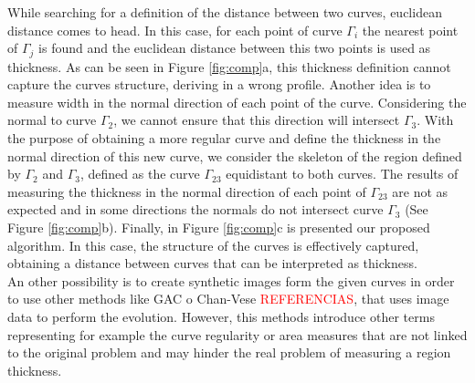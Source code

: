 \documentclass{article}
\begin{document}
While searching for a definition of the distance between two curves, euclidean distance comes to head. In this case, for each point of curve $\Gamma_i$ the nearest point of $\Gamma_j$ is found and the euclidean distance between this two points is used as thickness. As can be seen in Figure \ref{fig:comp}a, this thickness definition cannot capture the curves structure, deriving in a wrong profile. Another idea is to measure width in the normal direction of each point of the curve. Considering the normal to curve $\Gamma_2$, we cannot ensure that this direction will intersect $\Gamma_3$. With the purpose of obtaining a more regular curve and define the thickness in the normal direction of this new curve, we consider the skeleton of the region defined by $\Gamma_2$ and $\Gamma_3$, defined as the curve $\Gamma_{23}$ equidistant to both curves. The results of measuring the thickness in the normal direction of each point of $\Gamma_{23}$ are not as expected and in some directions the normals do not intersect curve $\Gamma_3$ (See Figure \ref{fig:comp}b). Finally, in Figure \ref{fig:comp}c is presented our proposed algorithm. In this case, the structure of the curves is effectively captured, obtaining a distance between curves that can be interpreted as thickness.\\

An other possibility is to create synthetic images form the given curves in order to use other methods like GAC o Chan-Vese \textcolor{red}{REFERENCIAS}, that uses image data to perform the evolution. However, this methods introduce other terms representing for example the curve regularity or area measures that are not linked to the original problem and may hinder the real problem of measuring a region thickness. 
\end{document}
